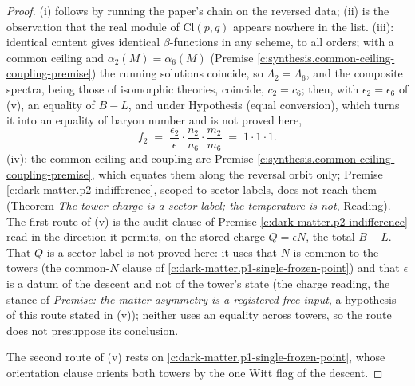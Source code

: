 \documentclass[11pt]{article}
\theoremstyle{definition}
\theoremstyle{plain}
\providecommand{\Cl}{}\renewcommand{\Cl}{\mathrm{Cl}}
\begin{document}
\begin{proof}
(i) follows by running the paper's chain on the reversed data; (ii) is the observation that the real module of $\Cl(p,q)$ appears nowhere in the list. (iii): identical content gives identical $\beta$-functions in any scheme, to all orders; with a common ceiling and $\alpha_{2}(M) = \alpha_{6}(M)$ (Premise \ref{c:synthesis.common-ceiling-coupling-premise}) the running solutions coincide, so $\Lambda_{2} = \Lambda_{6}$, and the composite spectra, being those of isomorphic theories, coincide, $c_{2} = c_{6}$; then, with $\epsilon_{2} = \epsilon_{6}$ of (v), an equality of $B - L$, and under Hypothesis (equal conversion), which turns it into an equality of baryon number and is not proved here,
\[
f_{2} \;=\; \frac{\epsilon_{2}}{\epsilon}\cdot\frac{n_{2}}{n_{6}}\cdot\frac{m_{2}}{m_{6}} \;=\; 1 \cdot 1 \cdot 1 .
\] (iv): the common ceiling and coupling are Premise \ref{c:synthesis.common-ceiling-coupling-premise}, which equates them along the reversal orbit only; Premise \ref{c:dark-matter.p2-indifference}, scoped to sector labels, does not reach them (Theorem \emph{The tower charge is a sector label; the temperature is not}, Reading). The first route of (v) is the audit clause of Premise \ref{c:dark-matter.p2-indifference} read in the direction it permits, on the stored charge $Q = \epsilon N$, the total $B - L$. That $Q$ is a sector label is not proved here: it uses that $N$ is common to the towers (the common-$N$ clause of \ref{c:dark-matter.p1-single-frozen-point}) and that $\epsilon$ is a datum of the descent and not of the tower's state (the charge reading, the stance of \emph{Premise: the matter asymmetry is a registered free input}, a hypothesis of this route stated in (v)); neither uses an equality across towers, so the route does not presuppose its conclusion.

The second route of (v) rests on \ref{c:dark-matter.p1-single-frozen-point}, whose orientation clause orients both towers by the one Witt flag of the descent.

\end{proof}
\end{document}
